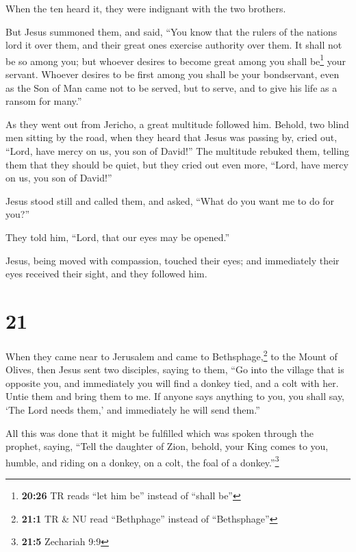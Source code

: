  When the ten heard it, they were indignant with the two
brothers.

 But Jesus summoned them, and said, ``You know that the
rulers of the nations lord it over them, and their great ones exercise
authority over them.  It shall not be so among you; but
whoever desires to become great among you shall be\footnote{\textbf{20:26}
  TR reads ``let him be'' instead of ``shall be''} your servant.
 Whoever desires to be first among you shall be your
bondservant,  even as the Son of Man came not to be
served, but to serve, and to give his life as a ransom for many.''

 As they went out from Jericho, a great multitude
followed him.  Behold, two blind men sitting by the road,
when they heard that Jesus was passing by, cried out, ``Lord, have mercy
on us, you son of David!''  The multitude rebuked them,
telling them that they should be quiet, but they cried out even more,
``Lord, have mercy on us, you son of David!''

 Jesus stood still and called them, and asked, ``What do
you want me to do for you?''

 They told him, ``Lord, that our eyes may be opened.''

 Jesus, being moved with compassion, touched their eyes;
and immediately their eyes received their sight, and they followed him.

\hypertarget{section-20}{%
\section{21}\label{section-20}}

 When they came near to Jerusalem and came to
Bethsphage,\footnote{\textbf{21:1} TR \& NU read ``Bethphage'' instead
  of ``Bethsphage''} to the Mount of Olives, then Jesus sent two
disciples,  saying to them, ``Go into the village that is
opposite you, and immediately you will find a donkey tied, and a colt
with her. Untie them and bring them to me.  If anyone says
anything to you, you shall say, `The Lord needs them,' and immediately
he will send them.''

 All this was done that it might be fulfilled which was
spoken through the prophet, saying,  ``Tell the daughter
of Zion, behold, your King comes to you, humble, and riding on a donkey,
on a colt, the foal of a donkey.''\footnote{\textbf{21:5} Zechariah 9:9}

